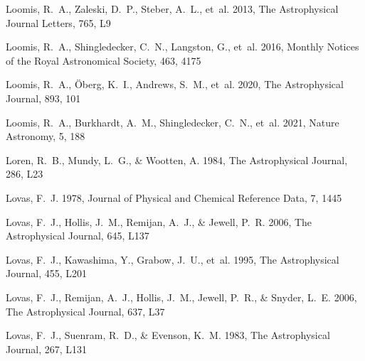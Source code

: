 \documentclass[twocolumn]{aastex631}
\begin{document}
\begin{thebibliography}{}
Loomis, R.~A., Zaleski, D.~P., Steber, A.~L., {et~al.} 2013, The Astrophysical
  Journal Letters, 765, L9

Loomis, R.~A., Shingledecker, C.~N., Langston, G., {et~al.} 2016, Monthly
  Notices of the Royal Astronomical Society, 463, 4175

Loomis, R.~A., {\"O}berg, K.~I., Andrews, S.~M., {et~al.} 2020, The
  Astrophysical Journal, 893, 101

Loomis, R.~A., Burkhardt, A.~M., Shingledecker, C.~N., {et~al.} 2021, Nature
  Astronomy, 5, 188

Loren, R.~B., Mundy, L.~G., \& Wootten, A. 1984, The Astrophysical Journal,
  286, L23

Lovas, F.~J. 1978, Journal of Physical and Chemical Reference Data, 7, 1445

Lovas, F.~J., Hollis, J.~M., Remijan, A.~J., \& Jewell, P.~R.
  2006{}, The Astrophysical Journal, 645, L137

Lovas, F.~J., Kawashima, Y., Grabow, J.~U., {et~al.} 1995, The Astrophysical
  Journal, 455, L201

Lovas, F.~J., Remijan, A.~J., Hollis, J.~M., Jewell, P.~R., \& Snyder, L.~E.
  2006{}, The Astrophysical Journal, 637, L37

Lovas, F.~J., Suenram, R.~D., \& Evenson, K.~M. 1983, The Astrophysical
  Journal, 267, L131


\end{thebibliography}
\end{document}
